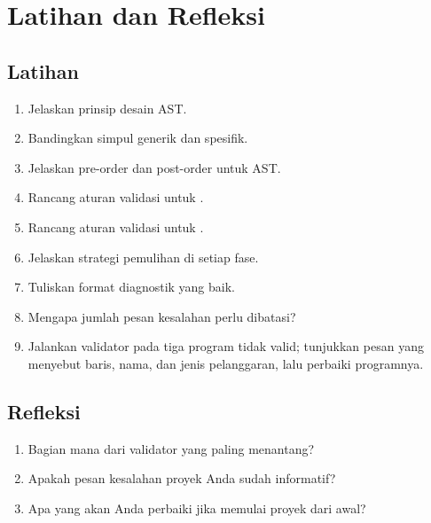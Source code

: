 \section*{Latihan dan Refleksi}

\subsection*{Latihan}
\begin{enumerate}[label=\arabic*.,leftmargin=*]
  \item Jelaskan prinsip desain AST.
  \item Bandingkan simpul generik dan spesifik.
  \item Jelaskan pre-order dan post-order untuk AST.
  \item Rancang aturan validasi untuk .
  \item Rancang aturan validasi untuk .
  \item Jelaskan strategi pemulihan di setiap fase.
  \item Tuliskan format diagnostik yang baik.
  \item Mengapa jumlah pesan kesalahan perlu dibatasi?
  \item Jalankan validator pada tiga program tidak valid; tunjukkan
        pesan yang menyebut baris, nama, dan jenis pelanggaran, lalu
        perbaiki programnya.
\end{enumerate}

\subsection*{Refleksi}
\begin{reflectionbox}
\begin{enumerate}[label=\arabic*.,leftmargin=*]
  \item Bagian mana dari validator yang paling menantang?
  \item Apakah pesan kesalahan proyek Anda sudah informatif?
  \item Apa yang akan Anda perbaiki jika memulai proyek dari awal?
\end{enumerate}
\end{reflectionbox}
